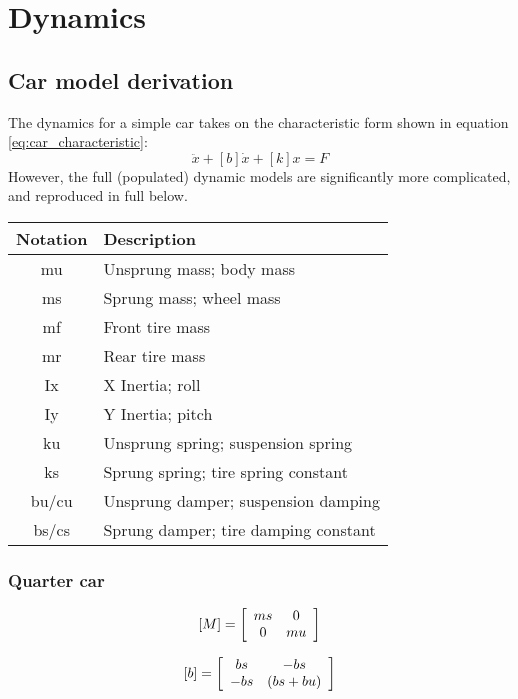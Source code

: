 \chapter{Dynamics}

\section{Car model derivation}
\label{a:dynamics}
The dynamics for a simple car takes on the characteristic form shown in equation \eqref{eq:car_characteristic}:
\begin{equation}
[M]\ddot{x}+[b]\dot{x}+[k]x=F
\end{equation}
However, the full (populated) dynamic models are significantly more complicated, and reproduced in full below.

\begin{center}
\begin{tabular}{| c | l |}
\hline
Notation & Description \\
\hline
mu & Unsprung mass; body mass \\
ms & Sprung mass; wheel mass \\
mf & Front tire mass \\
mr & Rear tire mass \\
\hline
Ix & X Inertia; roll \\
Iy & Y Inertia; pitch \\
\hline
ku & Unsprung spring; suspension spring \\
ks & Sprung spring; tire spring constant \\
\hline
bu/cu & Unsprung damper; suspension damping \\
bs/cs & Sprung damper; tire damping constant \\
\hline
\end{tabular}
\end{center}

\subsection{Quarter car}
\begin{equation} \label{eq:quarter_car_m}
	[M] = \left[
		\begin{array}{c c}
		ms & 0 \\
		0 & mu \\
		\end{array}
	\right]
\end{equation}

\begin{equation} \label{eq:quarter_car_b}
	[b] = \left[
		\begin{array}{c c}
		bs & -bs \\
		-bs & (bs+bu) \\
		\end{array}
	\right]
\end{equation}

